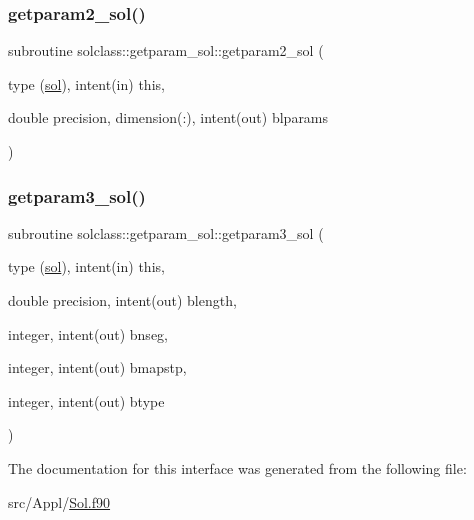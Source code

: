 \mbox{\label{interfacesolclass_1_1getparam__sol_a889ee2c360cf0e960f5387ddb2d07cdd}} 
\subsubsection{\texorpdfstring{getparam2\_sol()}{getparam2\_sol()}}
{\footnotesize\ttfamily subroutine solclass\+::getparam\+\_\+sol\+::getparam2\+\_\+sol (\begin{DoxyParamCaption}\item[{type (\mbox{\hyperlink{namespacesolclass_structsolclass_1_1sol}{sol}}), intent(in)}]{this,  }\item[{double precision, dimension(\+:), intent(out)}]{blparams }\end{DoxyParamCaption})}

\mbox{\label{interfacesolclass_1_1getparam__sol_af3692becfc093dfa17b0ccb2410af8e0}} 
\subsubsection{\texorpdfstring{getparam3\_sol()}{getparam3\_sol()}}
{\footnotesize\ttfamily subroutine solclass\+::getparam\+\_\+sol\+::getparam3\+\_\+sol (\begin{DoxyParamCaption}\item[{type (\mbox{\hyperlink{namespacesolclass_structsolclass_1_1sol}{sol}}), intent(in)}]{this,  }\item[{double precision, intent(out)}]{blength,  }\item[{integer, intent(out)}]{bnseg,  }\item[{integer, intent(out)}]{bmapstp,  }\item[{integer, intent(out)}]{btype }\end{DoxyParamCaption})}



The documentation for this interface was generated from the following file\+:\begin{DoxyCompactItemize}
\item 
src/\+Appl/\mbox{\hyperlink{_sol_8f90}{Sol.\+f90}}\end{DoxyCompactItemize}
